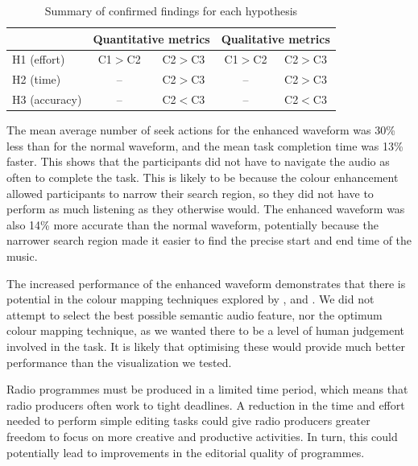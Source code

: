 \begin{table}[h]
  \centering
  \begin{tabular}{l | c c | c c}
    \hline
    & \multicolumn{2}{c|}{Quantitative metrics} & \multicolumn{2}{c}{Qualitative metrics} \\
    \hline
    H1 (effort)   & C1$>$C2 & C2$>$C3 & C1$>$C2 & C2$>$C3 \\
    H2 (time)     & --      & C2$>$C3 & --      & C2$>$C3 \\
    H3 (accuracy) & --      & C2$<$C3 & --      & C2$<$C3 \\
    \hline
  \end{tabular}
  \caption{Summary of confirmed findings for each hypothesis}
  \label{tab:hypotheses}
\end{table}

The mean average number of seek actions for the enhanced waveform was 30\% less than for the normal waveform, and the
mean task completion time was 13\% faster. This shows that the participants did not have to navigate the audio as often
to complete the task. This is likely to be because the colour enhancement allowed participants to narrow their search
region, so they did not have to perform as much listening as they otherwise would. The enhanced waveform was also 14\%
more accurate than the normal waveform, potentially because the narrower search region made it easier to find the
precise start and end time of the music.

The increased performance of the enhanced waveform demonstrates that there is potential in the colour mapping
techniques explored by \citet{Tzanetakis2000}, \citet{Rice2005} and \citet{Mason2007}. We did not attempt to select the
best possible semantic audio feature, nor the optimum colour mapping technique, as we wanted there to be a level of
human judgement involved in the task. It is likely that optimising these would provide much better performance than the
visualization we tested.

Radio programmes must be produced in a limited time period, which means that radio producers often work to tight
deadlines. A reduction in the time and effort needed to perform simple editing tasks could give radio producers greater
freedom to focus on more creative and productive activities. In turn, this could potentially lead to improvements in the
editorial quality of programmes.

